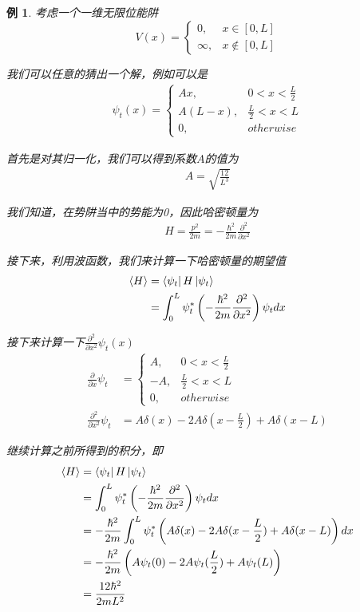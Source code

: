 \documentclass{article}
\newtheorem{example}{例}
\newcommand{\expectation}[1]{\langle #1 \rangle}
\begin{document}
\begin{example}
    考虑一个一维无限位能阱
    \[
        V(x)=
        \begin{cases}
        0,&x\in[0,L]\\ 
        \infty,&x\notin[0,L]
        \end{cases}
    \]
    
    我们可以任意的猜出一个解，例如可以是
    \begin{align*}
        \psi_t(x)=
        \begin{cases}
            Ax,&0<x<\frac{L}{2}\\
            A(L-x),&\frac{L}{2}<x<L\\
            0,&otherwise
        \end{cases}
    \end{align*}

    首先是对其归一化，我们可以得到系数$A$的值为
    \begin{align*}
        A=\sqrt{\frac{12}{L^3}}
    \end{align*}

    我们知道，在势阱当中的势能为0，因此哈密顿量为
    \begin{align*}
        H=\frac{p^2}{2m}=-\frac{\hbar^2}{2m}\frac{\partial^2}{\partial x^2}
    \end{align*}

    接下来，利用波函数，我们来计算一下哈密顿量的期望值
    \begin{align*}
        \expectation{H}&=\bra{\psi_t}H\ket{\psi_t}\\
        &=\int_{0}^{L}\psi^*_t\left(-\frac{\hbar^2}{2m}\frac{\partial^2}{\partial x^2}\right)\psi_tdx\\
    \end{align*}

    接下来计算一下$\displaystyle \frac{\partial^2}{\partial x^2}\psi_t(x)$
    \begin{align*}
        \frac{\partial}{\partial x}\psi_t&=
        \begin{cases}
            A,&0<x<\frac{L}{2}\\
            -A,&\frac{L}{2}<x<L\\
            0,&otherwise
        \end{cases}\\
        \frac{\partial^2}{\partial x^2}\psi_t&=A\delta(x)-2A\delta(x-\frac{L}{2})+A\delta(x-L)
    \end{align*}

    继续计算之前所得到的积分，即
    \begin{align*}
        \expectation{H}&=\bra{\psi_t}H\ket{\psi_t}\\
        &=\int_{0}^{L}\psi^*_t\left(-\frac{\hbar^2}{2m}\frac{\partial^2}{\partial x^2}\right)\psi_tdx\\
        &=-\frac{\hbar^2}{2m}\int_{0}^{L}\psi^*_t\left(A\delta(x)-2A\delta(x-\frac{L}{2})+A\delta(x-L)\right)dx\\
        &=-\frac{\hbar^2}{2m}\left(A\psi_t(0)-2A\psi_t(\frac{L}{2})+A\psi_t(L)\right)\\
        &=\frac{12\hbar^2}{2mL^2}
    \end{align*}



\end{example}
\end{document}
